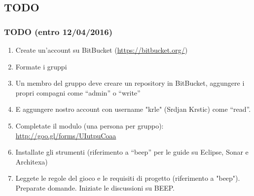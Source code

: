 \documentclass{beamer}
\begin{document}
\subsection{TODO}
\begin{frame}
\frametitle{TODO (entro 12/04/2016)}
\begin{enumerate}
\item Create un'account su BitBucket (\url{https://bitbucket.org/})
\item Formate i gruppi
\item Un membro del gruppo deve creare un repository in BitBucket,
  aggungere i propri compagni come ``admin'' o ``write''
\item E aggungere nostro account con username "krle" (Srdjan Krstic)
  come ``read''.
\item Completate il modulo (una persona per gruppo): 
\url{http://goo.gl/forms/UIutpuCoaa}
\item Installate gli strumenti (riferimento a ``beep'' per le guide su
  Eclipse, Sonar e Architexa)
\item Leggete le regole del gioco e le requisiti di progetto
  (riferimento a "beep"). Preparate domande. Iniziate le discussioni su BEEP.

\end{enumerate}
\end{frame}
\end{document}
